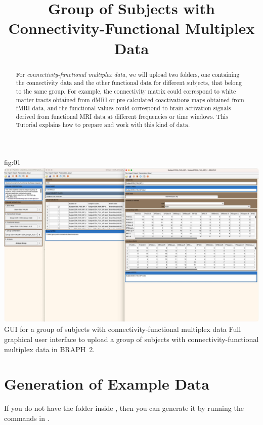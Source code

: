 \documentclass[justified]{tufte-handout}
\title{Group of Subjects with Connectivity-Functional Multiplex Data}
\begin{document}
\maketitle

\begin{abstract}
\noindent
For \emph{connectivity-functional multiplex data}, we will upload two folders, one containing the connectivity data and the other functional data for different subjects, that belong to the same group. For example, the connectivity matrix could correspond to white matter tracts obtained from dMRI or pre-calculated coactivations maps obtained from fMRI data, and the functional values could correspond to brain activation signals derived from functional MRI data at different frequencies or time windows. This Tutorial explains how to prepare and work with this kind of data.
\end{abstract}


\tableofcontents

	{fig:01}
	{\includegraphics{fig01.jpg}}
	{GUI for a group of subjects with connectivity-functional multiplex data}
	{
	Full graphical user interface to upload a group of subjects with connectivity-functional multiplex data in BRAPH~2. 
	}

\clearpage
\section{Generation of Example Data}

If you do not have the  folder inside , then you can generate it by running the commands in .
\end{document}

